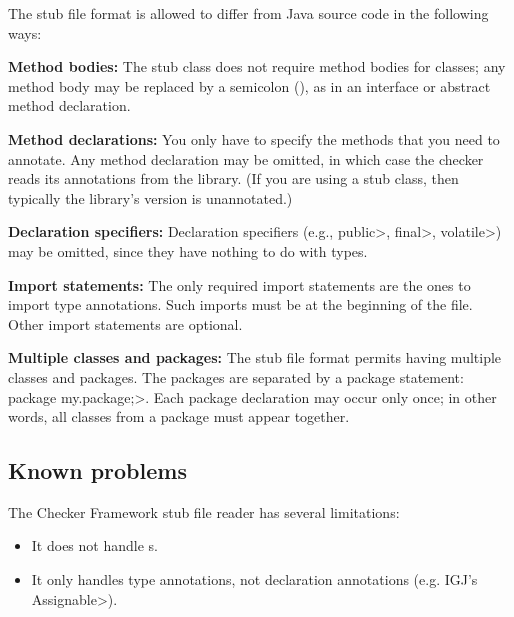 The stub file format is allowed to differ from Java source code in the
following ways:
\begin{description}

\item{\textbf{Method bodies:}}
  The stub class does not require method bodies for classes; any method
  body may be replaced by a semicolon (\code{;}), as in an interface or
  abstract method declaration.

\item{\textbf{Method declarations:}}
  You only have to specify the methods that you need to annotate.
  Any method declaration may be omitted, in which case the checker reads
  its annotations from the library.  (If you are using a stub class, then
  typically the library's version is unannotated.)

\item{\textbf{Declaration specifiers:}}
  Declaration specifiers (e.g., \<public>, \<final>, \<volatile>)
  may be omitted, since they have nothing to do with types.

\item{\textbf{Import statements:}}
  The only required import statements are the ones to import type
  annotations.  Such imports must be at the beginning of the
  file.  Other import statements are optional.

\item{\textbf{Multiple classes and packages:}}
  The stub file format permits having multiple classes and packages.
  The packages are separated by a package statement:
  \<package my.package;>.  Each package declaration may occur only once; in
  other words, all classes from a package must appear together.

\end{description}


\subsection{Known problems}


The Checker Framework stub file reader has several limitations:

\begin{itemize}
\item
  It does not handle s.
\item
  It only handles type annotations, not declaration annotations (e.g. IGJ's \<Assignable>).
\end{itemize}


